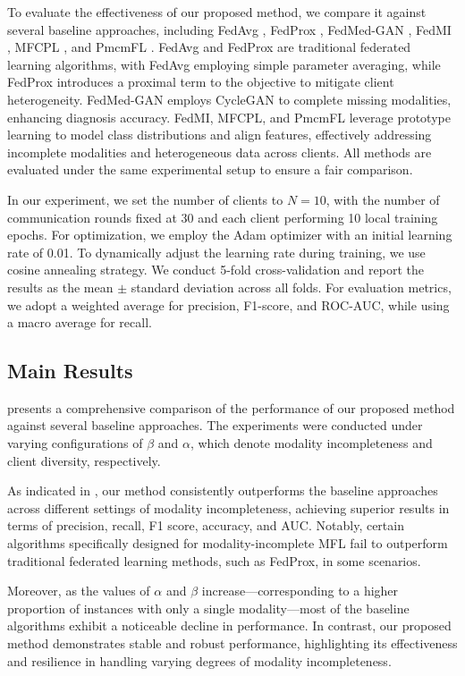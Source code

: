To evaluate the effectiveness of our proposed method, we compare it against several baseline approaches, including FedAvg \cite{FedAvg}, FedProx \cite{FedProx}, FedMed-GAN \cite{FedMed-GAN}, FedMI \cite{FedMI}, MFCPL \cite{MFCPL}, and PmcmFL \cite{PmcmFL}. FedAvg and FedProx are traditional federated learning algorithms, with FedAvg employing simple parameter averaging, while FedProx introduces a proximal term to the objective to mitigate client heterogeneity. FedMed-GAN employs CycleGAN \cite{cyclegan} to complete missing modalities, enhancing diagnosis accuracy. FedMI, MFCPL, and PmcmFL leverage prototype learning to model class distributions and align features, effectively addressing incomplete modalities and heterogeneous data across clients. All methods are evaluated under the same experimental setup to ensure a fair comparison.

In our experiment, we set the number of clients to $N=10$, with the number of communication rounds fixed at 30 and each client performing 10 local training epochs. For optimization, we employ the Adam \cite{adam} optimizer with an initial learning rate of 0.01. To dynamically adjust the learning rate during training, we use cosine annealing strategy. We conduct 5-fold cross-validation and report the results as the mean $\pm$ standard deviation across all folds. For evaluation metrics, we adopt a weighted average for precision, F1-score, and ROC-AUC, while using a macro average for recall.

\subsection{Main Results}
 presents a comprehensive comparison of the performance of our proposed method against several baseline approaches. The experiments were conducted under varying configurations of $\beta$ and $\alpha$, which denote modality incompleteness and client diversity, respectively.

As indicated in , our method consistently outperforms the baseline approaches across different settings of modality incompleteness, achieving superior results in terms of precision, recall, F1 score, accuracy, and AUC. Notably, certain algorithms specifically designed for modality-incomplete MFL fail to outperform traditional federated learning methods, such as FedProx, in some scenarios.

Moreover, as the values of $\alpha$ and $\beta$ increase—corresponding to a higher proportion of instances with only a single modality—most of the baseline algorithms exhibit a noticeable decline in performance. In contrast, our proposed method demonstrates stable and robust performance, highlighting its effectiveness and resilience in handling varying degrees of modality incompleteness.



